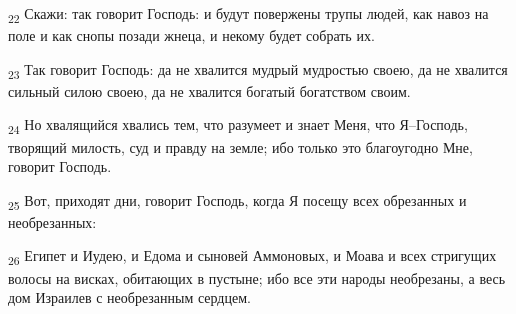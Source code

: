\begin{tcolorbox}
\textsubscript{22} Скажи: так говорит Господь: и будут повержены трупы людей, как навоз на поле и как снопы позади жнеца, и некому будет собрать их.
\end{tcolorbox}
\begin{tcolorbox}
\textsubscript{23} Так говорит Господь: да не хвалится мудрый мудростью своею, да не хвалится сильный силою своею, да не хвалится богатый богатством своим.
\end{tcolorbox}
\begin{tcolorbox}
\textsubscript{24} Но хвалящийся хвались тем, что разумеет и знает Меня, что Я--Господь, творящий милость, суд и правду на земле; ибо только это благоугодно Мне, говорит Господь.
\end{tcolorbox}
\begin{tcolorbox}
\textsubscript{25} Вот, приходят дни, говорит Господь, когда Я посещу всех обрезанных и необрезанных:
\end{tcolorbox}
\begin{tcolorbox}
\textsubscript{26} Египет и Иудею, и Едома и сыновей Аммоновых, и Моава и всех стригущих волосы на висках, обитающих в пустыне; ибо все эти народы необрезаны, а весь дом Израилев с необрезанным сердцем.
\end{tcolorbox}
